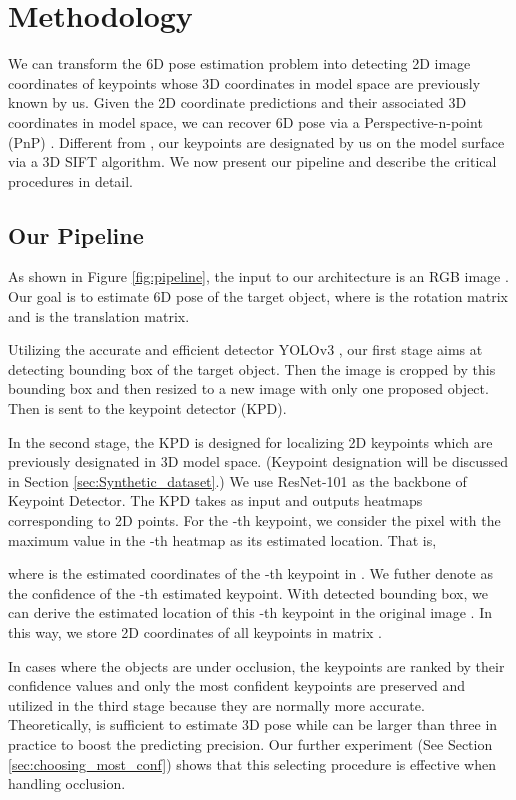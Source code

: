 \documentclass[10pt,twocolumn,letterpaper]{article}
\begin{document}
\section{Methodology}
We can transform the 6D pose estimation problem into detecting 2D image coordinates of keypoints whose 3D coordinates in model space are previously known by us. Given the 2D coordinate predictions and their associated 3D coordinates in model space, we can recover 6D pose via a Perspective-n-point (PnP) \cite{Lepetit2008EPnPAA}. Different from \cite{Rad2017BB8AS, tekin18}, our keypoints are designated by us on the model surface via a 3D SIFT \cite{Scovanner:2007:SDA:1291233.1291311} algorithm. We now present our pipeline and describe the critical procedures in detail.
\subsection{Our Pipeline}
\label{sec:pipeline}
As shown in Figure \ref{fig:pipeline}, the input to our architecture is an RGB image . Our goal is to estimate 6D pose  of the target object, where  is the rotation matrix and  is the translation matrix.

Utilizing the accurate and efficient detector YOLOv3 \cite{DBLP:journals/corr/abs-1804-02767}, our first stage aims at detecting bounding box of the target object. Then the image  is cropped by this bounding box and then resized to a new image  with only one proposed object. Then  is sent to the keypoint detector (KPD).

In the second stage, the KPD is designed for localizing 2D keypoints which are previously designated in 3D model space. (Keypoint designation will be discussed in Section \ref{sec:Synthetic_dataset}.) We use ResNet-101 \cite{DBLP:journals/corr/HeZRS15} as the backbone of Keypoint Detector. The KPD takes  as input and outputs  heatmaps corresponding to  2D points. For the -th keypoint, we consider the pixel with the maximum value in the -th heatmap as its estimated location. That is,

where  is the estimated coordinates of the -th keypoint in . We futher denote  as the confidence of the -th estimated keypoint. With detected bounding box, we can derive the estimated location of this -th keypoint in the original image . In this way, we store 2D coordinates of all keypoints in matrix .

In cases where the objects are under occlusion, the keypoints are ranked by their confidence values and only the  most confident keypoints are preserved and utilized in the third stage because they are normally more accurate. Theoretically,  is sufficient to estimate 3D pose while  can be larger than three in practice to boost the predicting precision. Our further experiment (See Section \ref{sec:choosing_most_conf}) shows that this selecting procedure is effective when handling occlusion.
\end{document}
